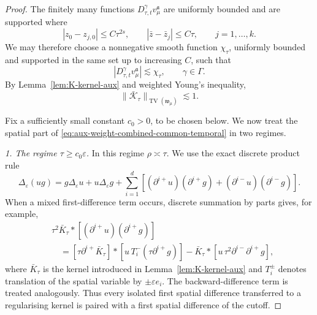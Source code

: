\documentclass{article}
\numberwithin{equation}{section}
\theoremstyle{plain}
\theoremstyle{definition}
\begin{document}
\begin{proof}
	The finitely many functions
	$D_{\tau,t}^{\gamma}v_\mu^{\mathfrak a}$ are uniformly bounded and are
	supported where
	\begin{equation}
		\label{eq:aux-weight-combined-chi-support}
		|z_0-z_{j,0}|\leqslant C\tau^{2s},
		\qquad
		|\bar z-\bar z_j|\leqslant C\tau,
		\qquad j=1,\ldots,k.
	\end{equation}
	We may therefore choose a nonnegative smooth function $\chi_\tau$,
	uniformly bounded and supported in the same set up to increasing $C$, such
	that
	\begin{equation}
		\label{eq:aux-weight-combined-chi-majorant}
		|D_{\tau,t}^{\gamma}v_\mu^{\mathfrak a}|
		\lesssim\chi_\tau,
		\qquad \gamma\in\Gamma.
	\end{equation}
	By Lemma~\ref{lem:K-kernel-aux} and weighted Young's inequality,
	\begin{equation}
		\label{eq:aux-weight-combined-spatial-TV}
		\|\bar{\mathcal K}_\tau\|_{
		\operatorname{TV}(\mathfrak w_\mu)}
		\lesssim1.
	\end{equation}
	
	Fix a sufficiently small constant $c_0>0$, to be chosen below. We now
	treat the spatial part of
	\eqref{eq:aux-weight-combined-common-temporal} in two regimes.
	
	\smallskip
	\noindent\emph{1. The regime $\tau\geqslant c_0\varepsilon$.}
	In this regime $\rho\asymp\tau$. We use the exact discrete product rule
	\begin{equation}
		\label{eq:aux-weight-combined-discrete-product}
		\Delta_\varepsilon(ug)
		=g\Delta_\varepsilon u+u\Delta_\varepsilon g
		+\sum_{i=1}^d
		\left[
		(\partial^{i+}u)(\partial^{i+}g)
		+(\partial^{i-}u)(\partial^{i-}g)
		\right].
	\end{equation}
	When a mixed first-difference term occurs, discrete summation by parts
	gives, for example,
	\begin{equation}
		\label{eq:aux-weight-combined-paired-differences}
		\begin{aligned}
			&\tau^2\bar K_\tau*
			[(\partial^{i+}u)(\partial^{i+}g)]
			\\
			&\quad=
			[\tau\partial^{i+}\bar K_\tau]*
			[u\,T_i^-(\tau\partial^{i+}g)]
			-\bar K_\tau*
			[u\,\tau^2\partial^{i-}\partial^{i+}g],
		\end{aligned}
	\end{equation}
	where $\bar K_\tau$ is the kernel introduced in
	Lemma~\ref{lem:K-kernel-aux} and $T_i^\pm$ denotes translation of the
	spatial variable by $\pm\varepsilon e_i$. The backward-difference term is
	treated analogously. Thus every isolated first spatial difference
	transferred to a regularising kernel is paired with a first spatial
	difference of the cutoff.
	

\end{proof}
\end{document}
